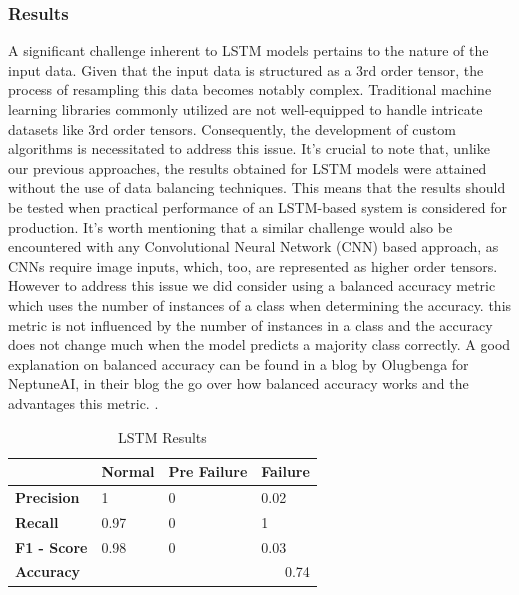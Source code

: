 \documentclass{article}
\begin{document}
\subsubsection{Results}

A significant challenge inherent to LSTM models pertains to the nature of the input data. Given that the input data is structured as a 3rd order tensor, the process of resampling this data becomes notably complex. Traditional machine learning libraries commonly utilized are not well-equipped to handle intricate datasets like 3rd order tensors. Consequently, the development of custom algorithms is necessitated to address this issue. It's crucial to note that, unlike our previous approaches, the results obtained for LSTM models were attained without the use of data balancing techniques. This means that the results should be tested when practical performance of an LSTM-based system is considered for production. It's worth mentioning that a similar challenge would also be encountered with any Convolutional Neural Network (CNN) based approach, as CNNs require image inputs, which, too, are represented as higher order tensors.\\

However to address this issue we did consider using a balanced accuracy metric which uses the number of instances of a class when determining the accuracy. this metric is not influenced by the number of instances in a class and the accuracy does not change much when the model predicts a majority class correctly. A good explanation on balanced accuracy can be found in a blog by Olugbenga for NeptuneAI, in their blog the go over how balanced accuracy works and the advantages this metric. \cite{Olugbenga2023}.\\

\begin{table}[htbp]
\caption{LSTM Results}
\centering
\begin{tabular}{|l|lll|}
\hline
                    & \multicolumn{1}{l|}{\textbf{Normal}} & \multicolumn{1}{l|}{\textbf{Pre Failure}} & \textbf{Failure} \\ \hline
\textbf{Precision}  & \multicolumn{1}{l|}{1}               & \multicolumn{1}{l|}{0}                    & 0.02             \\ \hline
\textbf{Recall}     & \multicolumn{1}{l|}{0.97}            & \multicolumn{1}{l|}{0}                    & 1                \\ \hline
\textbf{F1 - Score} & \multicolumn{1}{l|}{0.98}            & \multicolumn{1}{l|}{0}                    & 0.03             \\ \hline
\textbf{Accuracy}   & \multicolumn{3}{r|}{0.74}                                                                           \\ \hline
\end{tabular}
\end{table}
\end{document}
